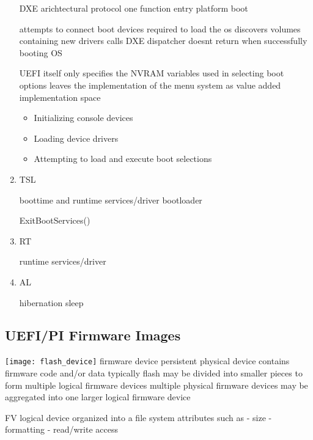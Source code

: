 \begin{enumerate}
    DXE arichtectural protocol
    one function entry
    platform boot

    attempts to connect boot devices required to load the os
    discovers volumes containing new drivers
    calls DXE dispatcher
    doesnt return when successfully booting OS

    UEFI itself only specifies the NVRAM variables used in selecting boot options
    leaves the implementation of the menu system as value added implementation space \cite{uefi-spec}

    \cite{pi-spec}

    \begin{itemize}
        \item Initializing console devices
        \item Loading device drivers
        \item Attempting to load and execute boot selections
    \end{itemize}

    \item{\acf{TSL}}

    boottime and runtime services/driver
    bootloader
    \cite[13.3 System Partition]{uefi-spec}
    \cite[3.5.1.1]{uefi-spec}

    ExitBootServices()

    \item{\acf{RT}}

    runtime services/driver

    \item{\acf{AL}}

    hibernation
    sleep

\end{enumerate}

\subsection{\acs{UEFI}/\acs{PI} Firmware Images}

\cite[Volume 3, 2.1]{pi-spec}

\texttt{[image: flash\_device]}
firmware device
persistent
physical device
contains firmware code and/or data
typically flash
may be divided into smaller pieces to form multiple logical firmware devices
multiple physical firmware devices may be aggregated into one larger logical firmware device

\acf{FV}
logical device
organized into a file system
attributes such as
- size
- formatting
- read/write access

